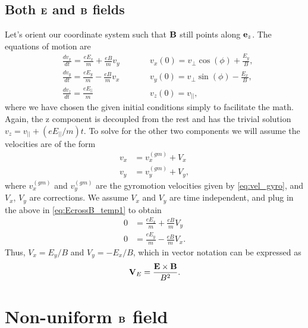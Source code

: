 \documentclass[oneside,a4paper,11pt]{report}
\begin{document}
\subsection{Both $\mathbf{E}$ and $\mathbf{B}$ fields}
\label{sec:E_and_B_field}
Let's orient our coordinate system such that $\mathbf{B}$ still points along $\mathbf{e}_z$. The equations of motion are
\begin{subequations}
\label{eq:EcrossB_temp1}
\begin{alignat}{2}
    &\frac{d v_x}{dt} = \frac{eE_x}{m} + \frac{eB}{m} v_y  \qquad && v_x(0) = v_\perp \cos(\phi) + \frac{E_y}{B}, \label{eq:E_and_B_1} \\
    &\frac{d v_y}{dt} = \frac{eE_y}{m} - \frac{eB}{m} v_x  \qquad && v_y(0) = v_\perp \sin(\phi) - \frac{E_x}{B}, \label{eq:E_and_B_2} \\
    &\frac{d v_z}{dt} = \frac{e E_{||}}{m}  \qquad && v_z(0) = v_{||}, \label{eq:E_and_B_3}
\end{alignat}
\end{subequations}
where we have chosen the given initial conditions simply to facilitate the math. Again, the z component is decoupled from the rest and has the trivial solution $v_z = v_{||} +  (eE_{||}/m) t$. To solve for the other two components we will assume the velocities are of the form
\begin{align}
    v_x &= v_x^{(gm)} + V_x \nonumber \\
    v_y &= v_y^{(gm)} + V_y,
\end{align}
where $v_x^{(gm)}$ and $v_y^{(gm)}$ are the gyromotion velocities given by \cref{eq:vel_gyro}, and $V_x$, $V_y$ are corrections. We assume $V_x$ and $V_y$ are time independent, and plug in the above in \cref{eq:EcrossB_temp1} to obtain
\begin{align}
    0 &= \frac{eE_x}{m} + \frac{eB}{m}V_y \nonumber \\
    0 &= \frac{eE_y}{m} - \frac{eB}{m}V_x.
\end{align}
Thus, $V_x = E_y/B$ and $V_y = -E_x/B$, which in vector notation can be expressed as
\begin{equation}
    \mathbf{V}_E = \frac{\mathbf{E} \times \mathbf{B}}{B^2}.
\end{equation}

\section{Non-uniform $\mathbf{B}$ field}
\end{document}
